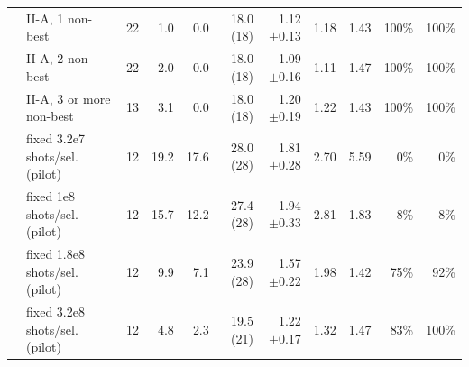 \begin{table}[!htb]
\begin{tabular}{llrrrrrrrrr}
 & II-A, 1 non-best & 22 & 1.0 & 0.0 & 18.0 (18) & 1.12 $\pm$0.13 & 1.18 & 1.43 & 100\% & 100\% \\
 & II-A, 2 non-best & 22 & 2.0 & 0.0 & 18.0 (18) & 1.09 $\pm$0.16 & 1.11 & 1.47 & 100\% & 100\% \\
 & II-A, 3 or more non-best & 13 & 3.1 & 0.0 & 18.0 (18) & 1.20 $\pm$0.19 & 1.22 & 1.43 & 100\% & 100\% \\
 & fixed 3.2e7 shots/sel. (pilot) & 12 & 19.2 & 17.6 & 28.0 (28) & 1.81 $\pm$0.28 & 2.70 & 5.59 & 0\% & 0\% \\
 & fixed 1e8 shots/sel. (pilot) & 12 & 15.7 & 12.2 & 27.4 (28) & 1.94 $\pm$0.33 & 2.81 & 1.83 & 8\% & 8\% \\
 & fixed 1.8e8 shots/sel. (pilot) & 12 & 9.9 & 7.1 & 23.9 (28) & 1.57 $\pm$0.22 & 1.98 & 1.42 & 75\% & 92\% \\
 & fixed 3.2e8 shots/sel. (pilot) & 12 & 4.8 & 2.3 & 19.5 (21) & 1.22 $\pm$0.17 & 1.32 & 1.47 & 83\% & 100\% \\
\bottomrule
\end{tabular}
\end{table}
